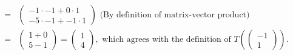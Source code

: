 \documentclass[12pt]{article}
\newenvironment{problem}[2][Problem]
{
	\begin{trivlist} 
		\item[\hskip \labelsep {\bfseries #1 #2:}]
	}
{
	\end{trivlist}
	}
\begin{document}
\begin{problem}{6}
\begin{align*}
=&\begin{pmatrix} -1\cdot -1 + 0\cdot 1\\ -5\cdot -1 + -1 \cdot 1 \end{pmatrix} \text{ (By definition of matrix-vector product)}& \\
=& \begin{pmatrix} 1+0\\ 5-1\end{pmatrix} =\begin{pmatrix} 1\\ 4 \end{pmatrix}, \text{ which agrees with the definition of $T\left(\begin{pmatrix}-1\\1\end{pmatrix}\right)$.} &
\end{align*}


\end{problem}
\end{document}
